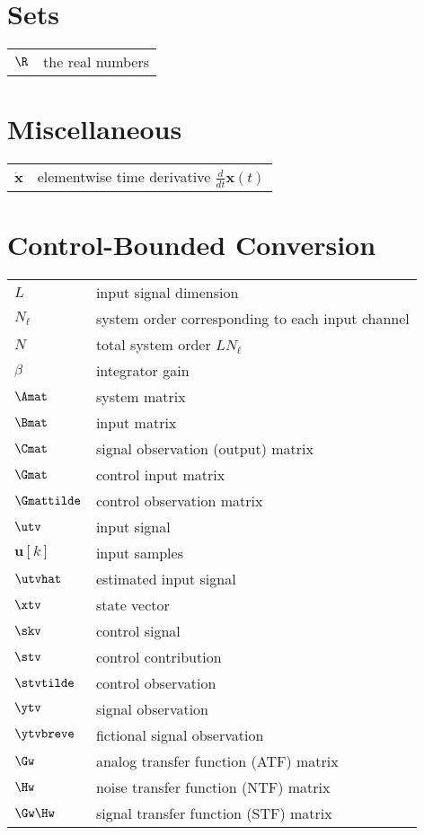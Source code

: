 \section*{Sets}
\begin{tabular}{ p{2cm} l }
    $\R$    & the real numbers

\end{tabular}

\section*{Miscellaneous}
\begin{tabular}{ p{2cm} l }
    $\dot{\bm{x}}$    & elementwise time derivative $\frac{d}{dt}\bm{x}(t)$ \\

\end{tabular}

\section*{Control-Bounded Conversion}
\begin{tabular}{ p{2cm} l }
    $L$         &  input signal dimension \\
    $N_\ell$    &  system order corresponding to each input channel \\
    $N$         &  total system order $L N_\ell$ \\
    $\beta$     &  integrator gain \\
    $\Amat$     &  system matrix \\
    $\Bmat$     &  input matrix \\
    $\Cmat$     &  signal observation (output) matrix \\
    $\Gmat$     &  control input matrix \\
    $\Gmattilde$&  control observation matrix \\
    $\utv$      &  input signal \\
    $\bm{u}[k]$ &  input samples \\
    $\utvhat$   &  estimated input signal \\
    $\xtv$      &  state vector \\
    $\skv$      &  control signal \\
    $\stv$      &  control contribution \\
    $\stvtilde$ &  control observation \\
    $\ytv$      &  signal observation \\
    $\ytvbreve$ &  fictional signal observation \\
    $\Gw$       &  analog transfer function (ATF) matrix \\
    $\Hw$       &  noise transfer function (NTF) matrix \\
    $\Gw\Hw$    &  signal transfer function (STF) matrix \\


\end{tabular}

